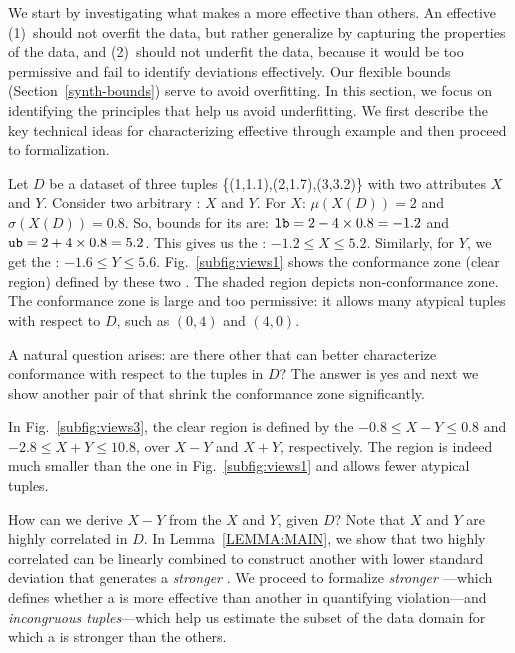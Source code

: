 We start by investigating what makes a \invariant more effective than others.
An effective \invariant (1)~should not overfit the data, but rather generalize
by capturing the properties of the data, and (2)~should not underfit the data,
because it would be too permissive and fail to identify deviations effectively.
Our flexible bounds (Section~\ref{synth-bounds}) serve to avoid overfitting. In
this section, we focus on identifying the principles that help us avoid
underfitting. We first describe the key technical ideas for characterizing
effective \views through example and then proceed to formalization.

% 
\begin{example}\label{ex:badproj}
	  Let $D$ be a dataset of three tuples
	 \{(1,1.1),(2,1.7),(3,3.2)\} with two attributes $X$ and $Y$. Consider two
	 arbitrary \views: $X$ and $Y$. For $X$: $\mu(X(D)) = 2$ and $\sigma(X(D)) =
	 0.8$. So, bounds for its \di are: ${\mathtt{lb}} = 2 - 4 \times 0.8 = -1.2$ and ${\mathtt{ub}} =
	 2 + 4 \times 0.8 = 5.2$. This gives us the \di: $-1.2 \le X \le 5.2$.
	 Similarly, for $Y$, we get the \di: $-1.6 \le Y \le 5.6$.
	 Fig.~\ref{subfig:views1} shows the conformance zone (clear region) defined by
	 these two \dis. The shaded region depicts non-conformance zone. The
	 conformance zone is large and too permissive: it allows many atypical tuples
	 with respect to $D$, such as $(0,4)$ and $(4, 0)$.
\end{example}

A natural question arises: are there other \views that can better characterize
conformance with respect to the tuples in $D$? The answer is yes and next we
show another pair of \views that shrink the conformance zone significantly.

\begin{example}\label{ex:goodproj} 
	 In Fig.~\ref{subfig:views3}, the clear region is defined by the \dis $-0.8
	 \le X - Y \le 0.8$ and $-2.8 \le X + Y \le 10.8$, over \views $X-Y$ and
	 $X+Y$, respectively. The region is indeed much smaller than the one in
	 Fig.~\ref{subfig:views1} and allows fewer atypical tuples.
\end{example}




How can we derive \view $X-Y$ from the \views $X$ and $Y$, given $D$? Note that
$X$ and $Y$ are highly correlated in $D$. In Lemma~\ref{LEMMA:MAIN}, we show
that two highly correlated \views can be linearly combined to construct another
\view with lower standard deviation that generates a \emph{stronger} \invariant.
We proceed to formalize {\em{stronger \invariant}}---which defines whether a
\invariant is more effective than another in quantifying violation---and
\emph{incongruous tuples}---which help us estimate the subset of the data
domain for which a \invariant is stronger than the others.

